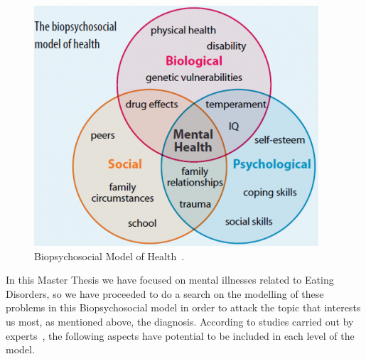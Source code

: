 \begin{figure}[!htp]
    \centering
    \includegraphics[scale=0.65]{img/state-of-art/biopsychosocial model.png}
    \caption{Biopsychosocial Model of Health~\cite{Biopsych52:online}.}
    \label{fig:biopsychosocial}
\end{figure}


In this Master Thesis we have focused on mental illnesses related to Eating Disorders, so we have proceeded to do a search on the modelling of these problems in this Biopsychosocial model in order to attack the topic that interests us most, as mentioned above, the diagnosis. According to studies carried out by experts~\cite{WhatCaus58:online}, the following aspects have potential to be included in each level of the model.

